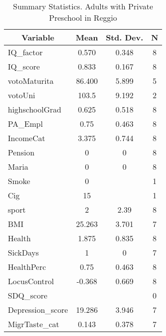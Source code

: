 
\begin{table}[htbp]\centering \caption{Summary Statistics. Adults with Private Preschool in Reggio \label{bothAdultmaternaPrivReggio}}
\begin{tabular}{l c c  c}\hline\hline
\multicolumn{1}{c}{\textbf{Variable}} & \textbf{Mean}
 & \textbf{Std. Dev.} & \textbf{N}\\ \hline
IQ\_factor & 0.570 & 0.348  & 8\\
IQ\_score & 0.833 & 0.167  & 8\\
votoMaturita & 86.400 & 5.899  & 5\\
votoUni & 103.5 & 9.192  & 2\\
highschoolGrad & 0.625 & 0.518  & 8\\
PA\_Empl & 0.75 & 0.463  & 8\\
IncomeCat & 3.375 & 0.744  & 8\\
Pension & 0 & 0  & 8\\
Maria & 0 & 0  & 8\\
Smoke & 0 &   & 1\\
Cig & 15 &   & 1\\
sport & 2 & 2.39  & 8\\
BMI & 25.263 & 3.701  & 7\\
Health & 1.875 & 0.835  & 8\\
SickDays & 1 & 0  & 7\\
HealthPerc & 0.75 & 0.463  & 8\\
LocusControl & -0.368 & 0.669  & 8\\
SDQ\_score &  &   & 0\\
Depression\_score & 19.286 & 3.946  & 7\\
MigrTaste\_cat & 0.143 & 0.378  & 7\\
\hline\end{tabular}
\end{table}
